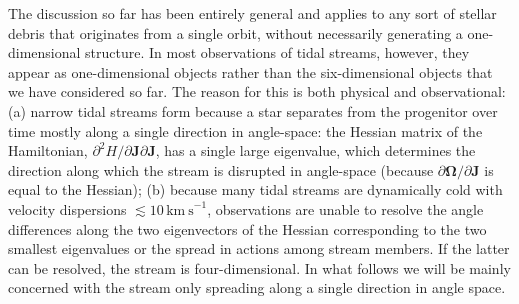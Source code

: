 \documentclass[12pt,preprint]{aastex}
\renewcommand{\vec}[1]{\ensuremath{\mathbf{#1}}}
\newcommand{\vecj}{\ensuremath{\vec{J}}}
\newcommand{\veco}{\ensuremath{\vec{\Omega}}}
\newcommand{\kms}{\ensuremath{\,\mathrm{km\ s}^{-1}}}
\begin{document}
The discussion so far has been entirely general and applies to any
sort of stellar debris that originates from a single orbit, without
necessarily generating a one-dimensional structure. In most
observations of tidal streams, however, they appear as one-dimensional
objects rather than the six-dimensional objects that we have
considered so far. The reason for this is both physical and
observational: (a) narrow tidal streams form because a star separates
from the progenitor over time mostly along a single direction in
angle-space: the Hessian matrix of the Hamiltonian, $\partial^2 H /
\partial \vecj \partial \vecj$, has a single large eigenvalue, which
determines the direction along which the stream is disrupted in
angle-space (because $\partial \veco / \partial \vecj$ is equal to the
Hessian); (b) because many tidal streams are dynamically cold with
velocity dispersions $\lesssim10\kms$, observations are unable to
resolve the angle differences along the two eigenvectors of the
Hessian corresponding to the two smallest eigenvalues or the spread in
actions among stream members. If the latter can be resolved, the
stream is four-dimensional. In what follows we will be mainly
concerned with the stream only spreading along a single direction in
angle space.
\end{document}
